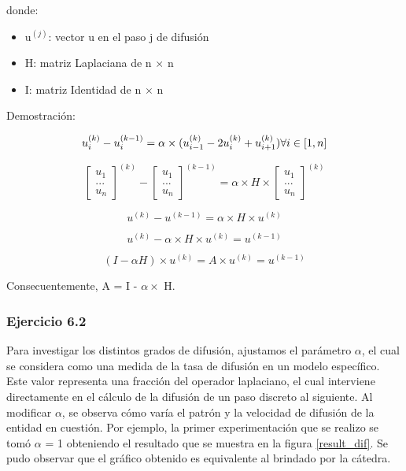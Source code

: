 donde:

\begin{itemize}
  \item u$^{(j)}$: vector u en el paso j de difusión
  \item H: matriz Laplaciana de n $\times$ n
  \item I: matriz Identidad de n $\times$ n
\end{itemize}

Demostración:

\begin{equation}
u_{i}^{(k)} - u_{i}^{(k-1)} = \alpha \times (u_{i-1}^{(k)} - 2u_{i}^{(k)} + u_{i+1}^{(k)}) \space \forall i \in [1, n]
\end{equation}

\begin{equation}
\begin{bmatrix}
u_{1}\\
...\\
u_{n}
\end{bmatrix}^{(k)}
-
\begin{bmatrix}
u_{1}\\
...\\
u_{n}
\end{bmatrix}^{(k-1)}
=
\alpha \times H \times
\begin{bmatrix}
u_{1}\\
...\\
u_{n}
\end{bmatrix}^{(k)}
\end{equation}

\begin{equation}
u^{(k)} - u^{(k-1)} = \alpha \times H \times u^{(k)}
\end{equation}

\begin{equation}
u^{(k)} - \alpha \times H \times u^{(k)} =  u^{(k-1)}
\end{equation}

\begin{equation}
(I - \alpha H) \times u^{(k)} = A \times u^{(k)} =  u^{(k-1)}
\end{equation}

Consecuentemente, A = I - $\alpha \times$ H.

\subsubsection{Ejercicio 6.2}
Para investigar los distintos grados de difusión, ajustamos el parámetro $\alpha$, el cual se considera como una medida de la tasa de difusión en un modelo específico. Este valor representa una fracción del operador laplaciano, el cual interviene directamente en el cálculo de la difusión de un paso discreto al siguiente.
Al modificar $\alpha$, se observa cómo varía el patrón y la velocidad de difusión de la entidad en cuestión. Por ejemplo, la primer experimentación que se realizo se tomó $\alpha$ = 1 obteniendo el resultado que se muestra en la figura \ref{result_dif}. Se pudo observar que el gráfico obtenido es equivalente al brindado por la cátedra.

